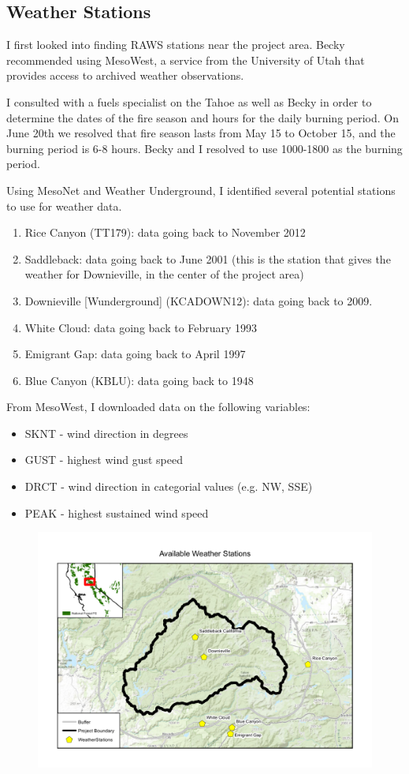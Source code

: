 \subsection{Weather Stations}
I first looked into finding RAWS stations near the project area. Becky recommended using MesoWest, a service from the University of Utah that provides access to archived weather observations.

I consulted with a fuels specialist on the Tahoe as well as Becky in order to determine the dates of the fire season and hours for the daily burning period. On June 20th we resolved that fire season lasts from May 15 to October 15, and the burning period is 6-8 hours. Becky and I resolved to use 1000-1800 as the burning period.

Using MesoNet and Weather Underground, I identified several potential stations to use for weather data.
\begin{enumerate}
\item Rice Canyon (TT179): data going back to November 2012 
\item Saddleback: data going back to June 2001 (this is the station that gives the weather for Downieville, in the center of the project area)
\item Downieville [Wunderground] (KCADOWN12): data going back to 2009.
\item White Cloud: data going back to February 1993
\item Emigrant Gap: data going back to April 1997
\item Blue Canyon (KBLU): data going back to 1948
\end{enumerate}

From MesoWest, I downloaded data on the following variables:
\begin{itemize}
\item SKNT - wind direction in degrees
\item GUST - highest wind gust speed
\item DRCT - wind direction in categorial values (e.g. NW, SSE)
\item PEAK - highest sustained wind speed
\end{itemize}

\begin{figure}[h!]
\centering
\includegraphics[width=\textwidth]{WeatherStationMap}
\end{figure}


